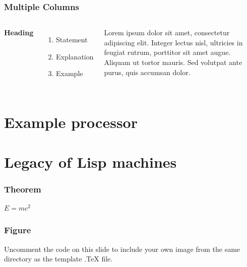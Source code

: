 \documentclass{beamer}
\begin{document}
\begin{frame}
	\frametitle{Multiple Columns}
	\begin{columns}[c] %
		
		\textbf{Heading}
		\begin{enumerate}
			\item Statement
			\item Explanation
			\item Example
		\end{enumerate}
		
		Lorem ipsum dolor sit amet, consectetur adipiscing elit. Integer lectus nisl, ultricies in feugiat rutrum, porttitor sit amet augue. Aliquam ut tortor mauris. Sed volutpat ante purus, quis accumsan dolor.
		
	\end{columns}
\end{frame}

\section{Example processor}

\section{Legacy of Lisp machines}




\begin{frame}
\frametitle{Theorem}
\begin{theorem}
$E = mc^2$
\end{theorem}
\end{frame}



\begin{frame}
\frametitle{Figure}
Uncomment the code on this slide to include your own image from the same directory as the template .TeX file.
\end{frame}
\end{document}
